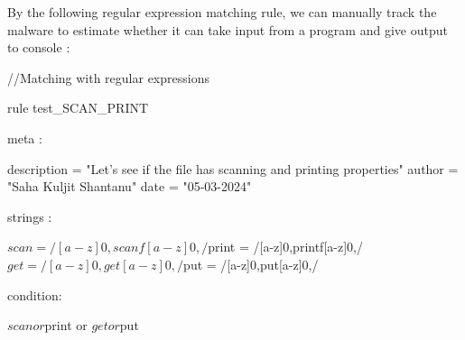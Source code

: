By the following regular expression matching rule, we can manually track the malware to estimate whether it can take input from a program and give output to console : \\

\begin{yaracode}

//Matching with regular expressions

rule test_SCAN_PRINT { 

    meta : 

        description = "Let's see if the file has scanning and printing properties"
        author = "Saha Kuljit Shantanu"
        date = "05-03-2024"

    strings :

        
        $scan = /[a-z]{0,}scanf[a-z]{0,}/   
        $print = /[a-z]{0,}printf[a-z]{0,}/
        $get = /[a-z]{0,}get[a-z]{0,}/   
        $put = /[a-z]{0,}put[a-z]{0,}/

    
    condition: 

        $scan or $print or $get or $put
    
    
}


\end{yaracode}